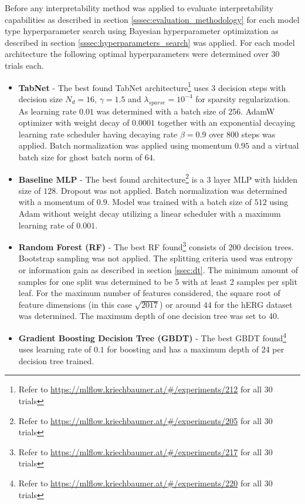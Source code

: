 \documentclass[../main.tex]{subfiles}
\begin{document}
Before any interpretability method was applied to evaluate interpretability capabilities as described in section \ref{sssec:evaluation_methodology} for each model type hyperparameter search using Bayesian hyperparameter optimization as described in section \ref{sssec:hyperparameters_search} was applied. For each model architecture the following optimal hyperparameters were determined over 30 trials each.

\begin{itemize}

	\item \textbf{TabNet} - The best found TabNet architecture\footnote{Refer to \url{https://mlflow.kriechbaumer.at/#/experiments/212} for all 30 trials} uses 3 decision steps with decision size $N_d=16$, $\gamma=1.5$ and $\lambda_{sparse}=10^{-4}$ for sparsity regularization. As learning rate $0.01$ was determined with a batch size of 256. AdamW optimizer with weight decay of $0.0001$ together with an exponential decaying learning rate scheduler having decaying rate $\beta=0.9$ over 800 steps was applied. Batch normalization was applied using momentum $0.95$ and a virtual batch size for ghost batch norm of $64$. 

	\item \textbf{Baseline MLP} - The best found architecture\footnote{Refer to \url{https://mlflow.kriechbaumer.at/#/experiments/205} for all 30 trials} is a 3 layer MLP with hidden size of $128$. Dropout was not applied. Batch normalization was determined with a momentum of $0.9$. Model was trained with a batch size of $512$ using Adam without weight decay utilizing a linear scheduler with a maximum learning rate of $0.001$.

	\item \textbf{Random Forest (RF)} - The best RF found\footnote{Refer to \url{https://mlflow.kriechbaumer.at/#/experiments/217} for all 30 trials} consists of 200 decision trees. Bootstrap sampling was not applied. The splitting criteria used was entropy or information gain as described in section \ref{ssec:dt}. The minimum amount of samples for one split was determined to be 5 with at least 2 samples per split leaf. For the maximum number of features considered, the square root of feature dimensions (in this case $\sqrt{2017}$) or around $44$ for the hERG dataset was determined. The maximum depth of one decision tree was set to 40.

	\item \textbf{Gradient Boosting Decision Tree (GBDT)} - The best GBDT found\footnote{Refer to \url{https://mlflow.kriechbaumer.at/#/experiments/220} for all 30 trials} uses learning rate of $0.1$ for boosting and has a maximum depth of 24 per decision tree trained. 

\end{itemize}
\end{document}
